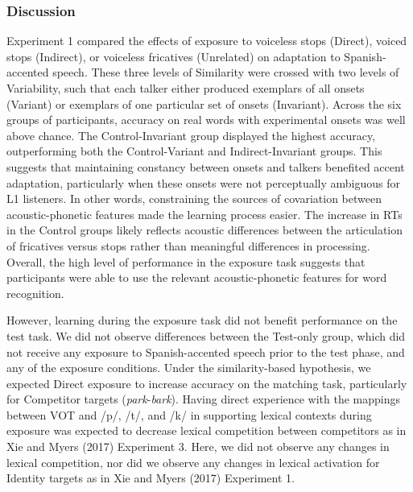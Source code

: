 \documentclass[
  12pt,
  twoside]{article}
\begin{document}
\hypertarget{discussion}{%
\subsubsection{Discussion}\label{discussion}}

Experiment 1 compared the effects of exposure to voiceless stops (Direct), voiced stops (Indirect), or voiceless fricatives (Unrelated) on adaptation to Spanish-accented speech.
These three levels of Similarity were crossed with two levels of Variability, such that each talker either produced exemplars of all onsets (Variant) or exemplars of one particular set of onsets (Invariant).
Across the six groups of participants, accuracy on real words with experimental onsets was well above chance.
The Control-Invariant group displayed the highest accuracy, outperforming both the Control-Variant and Indirect-Invariant groups.
This suggests that maintaining constancy between onsets and talkers benefited accent adaptation, particularly when these onsets were not perceptually ambiguous for L1 listeners.
In other words, constraining the sources of covariation between acoustic-phonetic features made the learning process easier.
The increase in RTs in the Control groups likely reflects acoustic differences between the articulation of fricatives versus stops rather than meaningful differences in processing.
Overall, the high level of performance in the exposure task suggests that participants were able to use the relevant acoustic-phonetic features for word recognition.

However, learning during the exposure task did not benefit performance on the test task.
We did not observe differences between the Test-only group, which did not receive any exposure to Spanish-accented speech prior to the test phase, and any of the exposure conditions.
Under the similarity-based hypothesis, we expected Direct exposure to increase accuracy on the matching task, particularly for Competitor targets (\emph{park}-\emph{bark}).
Having direct experience with the mappings between VOT and /p/, /t/, and /k/ in supporting lexical contexts during exposure was expected to decrease lexical competition between competitors as in Xie and Myers (2017) Experiment 3.
Here, we did not observe any changes in lexical competition, nor did we observe any changes in lexical activation for Identity targets as in Xie and Myers (2017) Experiment 1.
\end{document}
